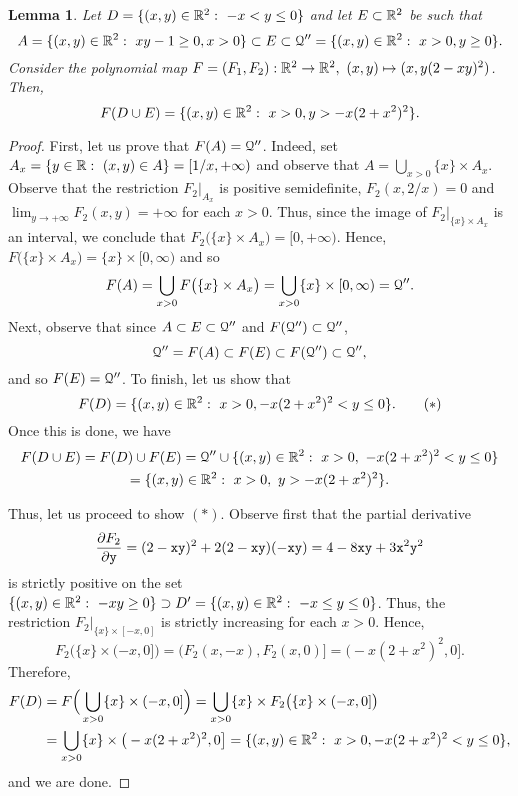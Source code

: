 \documentclass[11pt,a4paper]{amsart}
\newtheorem{lem}[theor]{Lemma}
\theoremstyle{definition}
\theoremstyle{remark}
\newcommand{\Qq}{{\EuScript Q}}
\newcommand{\x}{{\tt x}} \newcommand{\y}{{\tt y}}
\begin{document}
\begin{lem}\label{step4}
Let $D=\{(x,y)\in{\mathbb R}^2:\ -x<y\leq0\}$ and let $E\subset{\mathbb R}^2$ be such that 
$$
A=\{(x,y)\in\R^2:\ xy-1\geq0,x>0\}\subset E\subset\Qq''=\{(x,y)\in\R^2:\ x>0,y\geq0\}.
$$ 
Consider the polynomial map $F=(F_1,F_2):\R^2\to\R^2,\ (x,y)\mapsto(x,y(2-xy)^2)$. Then, 
$$
F(D\cup E)=\{(x,y)\in\R^2:\ x>0,y>-x(2+x^2)^2\}.
$$
\end{lem}
\begin{proof}
First, let us prove that $F(A)=\Qq''$. Indeed, set $A_x=\{y\in{\mathbb R}:\ (x,y)\in A\}=[1/x,+\infty)$ and observe that $A=\bigcup_{x>0}\{x\}\times A_x$. Observe that the restriction $F_2|_{A_x}$ is positive semidefinite, $F_2(x,2/x)=0$ and $\lim_{y\to+\infty}F_2(x,y)=+\infty$ for each $x>0$. Thus, since the image of $F_2|_{\{x\}\times A_x}$ is an interval, we conclude that $F_2\big(\{x\}\times A_x\big)=[0,+\infty)$. Hence, $F\big(\{x\}\times A_x\big)=\{x\}\times[0,\infty)$ and so 
$$
F(A)=\bigcup_{x>0}F\big(\{x\}\times A_x\big)=\bigcup_{x>0}\{x\}\times[0,\infty)=\Qq''.
$$
Next, observe that since $A\subset E\subset\Qq''$ and $F(\Qq'')\subset\Qq''$, 
$$
\Qq''=F(A)\subset F(E)\subset F(\Qq'')\subset\Qq'',
$$
and so $F(E)=\Qq''$. To finish, let us show that 
$$
F(D)=\{(x,y)\in\R^2:\ x>0,-x(2+x^2)^2<y\leq0\}.\qquad(\ast) 
$$
Once this is done, we have 
\begin{multline*}
F(D\cup E)=F(D)\cup F(E)=\Qq''\cup\{(x,y)\in\R^2:\ x>0,\ -x(2+x^2)^2<y\leq0\}\\
=\{(x,y)\in\R^2:\ x>0,\ y>-x(2+x^2)^2\}.
\end{multline*}

Thus, let us proceed to show $(\ast)$. Observe first that the partial derivative
$$
\frac{\partial F_2}{\partial \y}=(2-\x\y)^2+2(2-\x\y)(-\x\y)=4-8\x\y+3\x^2\y^2
$$
is strictly positive on the set $\{(x,y)\in{\mathbb R}^2:\ -xy\geq0\}\supset D'=\{(x,y)\in{\mathbb R}^2:\ -x\leq y\leq0\}$. Thus, the restriction $F_2|_{\{x\}\times[-x,0]}$ is strictly increasing for each $x>0$. Hence, 
$$
F_2\big(\{x\}\times(-x,0]\big)=\big(F_2(x,-x),F_2(x,0)\big]=\big(-x(2+x^2)^2,0\big].
$$
Therefore,
\begin{equation*}
\begin{split}
F(D)&=F\Big(\bigcup_{x>0}\{x\}\times(-x,0]\Big)=\bigcup_{x>0}\{x\}\times F_2\big(\{x\}\times(-x,0]\big)\\
&=\bigcup_{x>0}\{x\}\times\big(-x(2+x^2)^2,0\big]=\{(x,y)\in\R^2:\ x>0,-x(2+x^2)^2<y\leq0\},
\end{split}
\end{equation*}
and we are done.
\end{proof}
\end{document}
